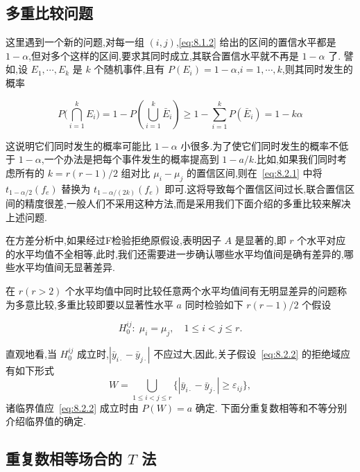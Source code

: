 \subsection{多重比较问题}

这里遇到一个新的问题,对每一组 $(i, j)$,\eqref{eq:8.1.2} 给出的区间的置信水平都是 $1-\alpha$,但对多个这样的区间,要求其同时成立,其联合置信水平就不再是  $1-\alpha$ 了. 譬如,设 $E_1,\cdots, E_k$ 是 $k$ 个随机事件,且有 $P(E_i)=1-\alpha$,$i=1,\cdots, k$,则其同时发生的概率

\begin{equation}
  P\big(\bigcap_{i=1}^{k} E_{i}\big)=1-P\left(\bigcup_{i=1}^{k} \bar{E}_{i}\right) \geqslant 1-\sum_{i=1}^{k} P\left(\bar{E}_{i}\right)=1-k \alpha
\end{equation}

这说明它们同时发生的概率可能比 $1-\alpha$ 小很多.为了使它们同时发生的概率不低于 $1-\alpha$,一个办法是把每个事件发生的概率提高到 $1-a/k$.比如,如果我们同时考虑所有的 $k = r(r-1)/2$ 组对比 $\mu_i - \mu_j$ 的置信区间,则在~\eqref{eq:8.2.1} 中将 $t_{1-\alpha/2}(f_e)$ 替换为 $t_{1-\alpha/(2k)}(f_e)$ 即可.这将导致每个置信区间过长,联合置信区间的精度很差,一般人们不采用这种方法,而是采用我们下面介绍的多重比较来解决上述问题.

在方差分析中,如果经过F检验拒绝原假设,表明因子 $A$ 是显著的,即 $r$ 个水平对应的水平均值不全相等,此时,我们还需要进一步确认哪些水平均值间是确有差异的,哪些水平均值间无显著差异.

在 $r(r>2)$ 个水平均值中同时比较任意两个水平均值间有无明显差异的问题称为多意比较,多重比较即要以显著性水平 $a$ 同时检验如下 $r(r-1)/2$ 个假设

\begin{equation}\label{eq:8.2.2}
  H_{0}^{ij}:\; \mu_i = \mu_j,\quad 1 \leq i < j \leq r.
\end{equation}

直观地看,当 $H_{0}^{ij}$ 成立时,$|\bar{y}_{i\cdot} - \bar{y}_{j\cdot}|$ 不应过大,因此,关子假设~\eqref{eq:8.2.2} 的拒绝域应有如下形式
\begin{equation*}
  W = \bigcup_{1\leq i < j \leq r}\{|\bar{y}_{i\cdot} - \bar{y}_{j\cdot}| \geq \varepsilon_{ij}\},
\end{equation*}
诸临界值应~\eqref{eq:8.2.2} 成立时由 $P(W)=a$ 确定. 下面分重复数相等和不等分别介绍临界值的确定.

\subsection[重复数相等场合的 T 法]{重复数相等场合的 $T$ 法}

